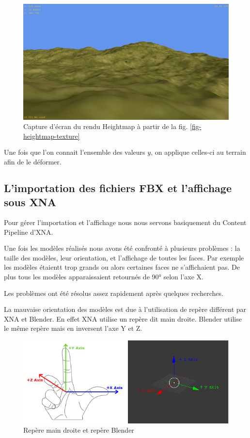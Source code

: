 \documentclass[11pt]{report}
\begin{document}
\begin{figure}[htbp]
\centering
\includegraphics[scale=1]{heightmap-rendu.png}
\caption{Capture d'écran du rendu Heightmap à partir de la fig. \ref{fig-heightmap-texture}}
\end{figure}

Une fois que l'on connait l'ensemble des valeurs \( y \), on applique celles-ci au terrain afin de le déformer.

\subsection{L’importation des fichiers FBX et l’affichage sous XNA}

Pour gérer l'importation et l’affichage nous nous servons basiquement du Content Pipeline d’XNA.

Une fois les modèles réalisés nous avons été confronté à plusieurs problèmes : la taille des modèles, leur orientation, et l’affichage de toutes les faces. Par exemple les modèles étaientt trop grands ou alors certaines faces ne s’affichaient pas. De plus tous les modèles apparaissaient retournés de \ang{90} selon l'axe X.

Les problèmes ont été résolus assez rapidement après quelques recherches.

La mauvaise orientation des modèles est due à l'utilisation de repère différent par XNA et Blender. En effet XNA utilise un repère dit main droite. Blender utilise le même repère mais en inversent l'axe Y et Z.

\begin{figure}[htbp]
\centering
\includegraphics[scale=0.6]{repere.png}
\caption{Repère main droite et repère Blender}
\end{figure}
\end{document}
